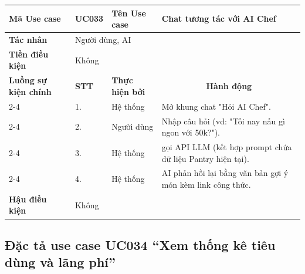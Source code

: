 \documentclass[../main.tex]{subfiles}
\begin{document}
\begin{longtable}{|p{2.7cm}|p{0.8cm}|p{2.6cm}|p{7.3cm}|}
\hline
\cellcolor[HTML]{D5F5E3}\textbf{Mã Use case} & \multicolumn{1}{l|}{UC033} & \cellcolor[HTML]{D5F5E3}\textbf{Tên Use case} & Chat tương tác với AI Chef \\ \hline
\cellcolor[HTML]{D5F5E3}\textbf{Tác nhân} & \multicolumn{3}{p{10.7cm}|}{Người dùng, AI} \\ \hline
\cellcolor[HTML]{D5F5E3}\textbf{Tiền điều kiện} & \multicolumn{3}{p{10.7cm}|}{Không} \\ \hline

\cellcolor[HTML]{D5F5E3}\textbf{Luồng sự kiện chính} & \cellcolor[HTML]{FDEBD0}\textbf{STT} & \cellcolor[HTML]{FDEBD0}\textbf{Thực hiện bởi} & \multicolumn{1}{c|}{\cellcolor[HTML]{FDEBD0}\textbf{Hành động}} \\ \cline{2-4} 
\cellcolor[HTML]{D5F5E3} & 1. & Hệ thống & Mở khung chat "Hỏi AI Chef". \\ \cline{2-4} 
\cellcolor[HTML]{D5F5E3} & 2. & Người dùng & Nhập câu hỏi (vd: "Tối nay nấu gì ngon với 50k?"). \\ \cline{2-4} 
\cellcolor[HTML]{D5F5E3} & 3. & Hệ thống & gọi API LLM (kết hợp prompt chứa dữ liệu Pantry hiện tại). \\ \cline{2-4} 
\cellcolor[HTML]{D5F5E3} & 4. & Hệ thống & AI phản hồi lại bằng văn bản gợi ý món kèm link công thức. \\ \hline

\cellcolor[HTML]{D5F5E3}\textbf{Hậu điều kiện} & \multicolumn{3}{p{10.7cm}|}{Không} \\ \hline
\end{longtable}
\endgroup

\subsection{Đặc tả use case UC034 ``Xem thống kê tiêu dùng và lãng phí''}
\vspace{0.5cm}

\begingroup
\renewcommand{\arraystretch}{1.5}
\end{document}

